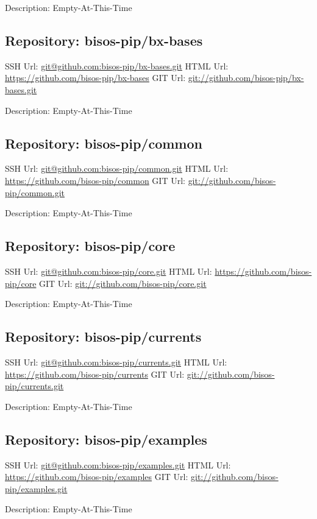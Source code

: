 Description: Empty-At-This-Time

\subsection{Repository: bisos-pip/bx-bases}

SSH Url:  \url{git@github.com:bisos-pip/bx-bases.git}
HTML Url: \url{https://github.com/bisos-pip/bx-bases}
GIT Url:  \url{git://github.com/bisos-pip/bx-bases.git}

Description: Empty-At-This-Time

\subsection{Repository: bisos-pip/common}

SSH Url:  \url{git@github.com:bisos-pip/common.git}
HTML Url: \url{https://github.com/bisos-pip/common}
GIT Url:  \url{git://github.com/bisos-pip/common.git}

Description: Empty-At-This-Time

\subsection{Repository: bisos-pip/core}

SSH Url:  \url{git@github.com:bisos-pip/core.git}
HTML Url: \url{https://github.com/bisos-pip/core}
GIT Url:  \url{git://github.com/bisos-pip/core.git}

Description: Empty-At-This-Time

\subsection{Repository: bisos-pip/currents}

SSH Url:  \url{git@github.com:bisos-pip/currents.git}
HTML Url: \url{https://github.com/bisos-pip/currents}
GIT Url:  \url{git://github.com/bisos-pip/currents.git}

Description: Empty-At-This-Time

\subsection{Repository: bisos-pip/examples}

SSH Url:  \url{git@github.com:bisos-pip/examples.git}
HTML Url: \url{https://github.com/bisos-pip/examples}
GIT Url:  \url{git://github.com/bisos-pip/examples.git}

Description: Empty-At-This-Time

